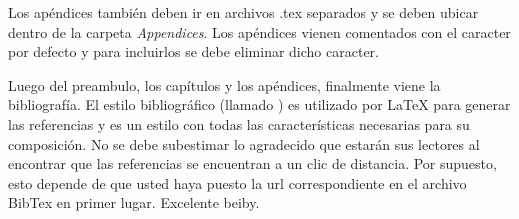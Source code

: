 Los apéndices también deben ir en archivos .tex separados y se deben ubicar dentro de la carpeta \emph{Appendices}. Los apéndices vienen comentados con el caracter \code{\%} por defecto y para incluirlos se debe eliminar dicho caracter.

Luego del preambulo, los capítulos y los apéndices, finalmente viene la bibliografía. El estilo bibliográfico (llamado ) es utilizado por \LaTeX{} para generar las referencias y es un estilo con todas las características necesarias para su composición.  No se debe subestimar lo agradecido que estarán sus lectores al encontrar que las referencias se encuentran a un clic de distancia.  Por supuesto, esto depende de que usted haya puesto la url correspondiente en el archivo BibTex en primer lugar. Excelente beiby.







